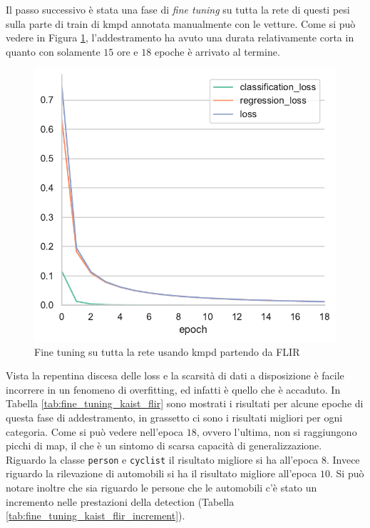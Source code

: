 Il passo successivo è stata una fase di \textit{fine tuning} su tutta la rete di questi pesi sulla parte di train di \ac{kmpd} annotata manualmente con le vetture. Come si può vedere in Figura \ref{fig:fine_tuning_kaist_flir}, l'addestramento ha avuto una durata relativamente corta in quanto con solamente $15$ ore e $18$ epoche è arrivato al termine.
\begin{figure}[]
    \centering
    \includegraphics[width=\textwidth]{images/graphic/fine_tuning_kaist_flir.pdf}
    \caption{Fine tuning su tutta la rete usando \ac{kmpd} partendo da FLIR}
    \label{fig:fine_tuning_kaist_flir}
\end{figure}
Vista la repentina discesa delle loss e la scarsità di dati a disposizione è facile incorrere in un fenomeno di overfitting, ed infatti è quello che è accaduto. In Tabella \ref{tab:fine_tuning_kaist_flir} sono mostrati i risultati per alcune epoche di questa fase di addestramento, in grassetto ci sono i risultati migliori per ogni categoria. Come si può vedere nell'epoca $18$, ovvero l'ultima, non si raggiungono picchi di \ac{map}, il che è un sintomo di scarsa capacità di generalizzazione. Riguardo la classe \texttt{person} e \texttt{cyclist} il risultato migliore si ha all'epoca $8$. Invece riguardo la rilevazione di automobili si ha il risultato migliore all'epoca $10$. Si può notare inoltre che sia riguardo le persone che le automobili c'è stato un incremento nelle prestazioni della detection (Tabella \ref{tab:fine_tuning_kaist_flir_increment}). 
